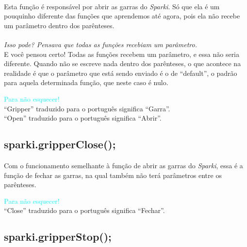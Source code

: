 \paragraph{}
Esta função é responsável por abrir as garras do \textsl{Sparki}. Só que ela é um pouquinho diferente das funções que aprendemos até agora, pois ela não recebe um parâmetro dentro dos parênteses.
\\~\\
\textit{Isso pode? Pensava que todas as funções recebiam um parâmetro.} \\
E você pensou certo! Todas as funções recebem um parâmetro, e essa não seria diferente. Quando não se escreve nada dentro dos parênteses, o que acontece na realidade é que o parâmetro que está sendo enviado é o de ``default'', o padrão para aquela determinada função, que neste caso é nulo. 

    \begin{center}
    \textcolor{cyan}{Para não esquecer!}
   \\``Gripper'' traduzido para o português significa ``Garra''.
    \\``Open'' traduzido para o português significa ``Abrir''.
    \end{center}

\subsection{sparki.gripperClose();}

\paragraph{}
Com o funcionamento semelhante à função de abrir as garras do \textsl{Sparki}, essa é a função de fechar as garras, na qual também não terá parâmetros entre os parênteses.

    \begin{center}
    \textcolor{cyan}{Para não esquecer!}
    \\``Close'' traduzido para o português significa ``Fechar''.
    \end{center}
    
\subsection{sparki.gripperStop();}

